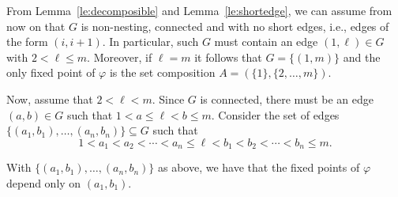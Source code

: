 \documentclass[ALCO,ThmDefs,Unicode,epreuves]{cedram}
\begin{document}
From Lemma~\ref{le:decomposible} and Lemma~\ref{le:shortedge}, we can assume from now on that $G$ is non-nesting, connected and with no short edges, i.e., edges of the form $(i,i+1)$. In particular, such $G$ must contain an edge $(1,\ell)\in G$ with $2<\ell\le m$. Moreover, if $\ell=m$ it follows that $G=\{(1,m)\}$ and the only fixed point of $\varphi$ is the set composition $A=(\{1\},\{2,\ldots,m\})$. 


Now, assume that $2<\ell<m$. Since $G$ is connected, there must be an edge
$(a,b)\in G$ such that $1<a\le \ell<b\le m$. Consider the set of edges $\big\{(a_1,b_1),\ldots,(a_n,b_n)\big\}\subseteq G$ such that $$1<a_1<a_2<\cdots<a_n\le\ell<b_1<b_2<\cdots< b_n\le m.$$

\begin{lemma}\label{le:nequal1} With $\big\{(a_1,b_1),\ldots,(a_n,b_n)\big\}$ as above, we have that the fixed points of $\varphi$ depend only on $(a_1,b_1)$.
\end{lemma}
\end{document}
